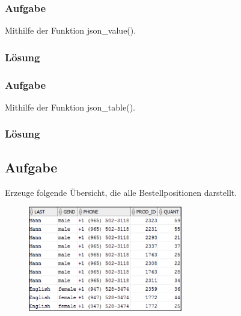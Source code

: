 \label{subsec:uebung_10.aufgabe_01a}
\subsubsection{Aufgabe}
Mithilfe der Funktion json\_value().

\subsubsection*{Lösung}
\label{subsubsec:uebung_10.aufgabe_01a.loesung}


\label{subsec:uebung_10.aufgabe_01b}
\subsubsection{Aufgabe}
Mithilfe der Funktion json\_table().

\subsubsection*{Lösung}
\label{subsubsec:uebung_10.aufgabe_01b.loesung}


\label{subsec:uebung_10.aufgabe_02}
\subsection{Aufgabe}
Erzeuge folgende Übersicht, die alle Bestellpositionen darstellt.

\begin{figure}[H]
  \centering
  \includegraphics[width=0.6\textwidth]{img//uebung_10_-_aufgabe_02.png}
  \label{img:uebung_10_-_aufgabe_02}
\end{figure}

